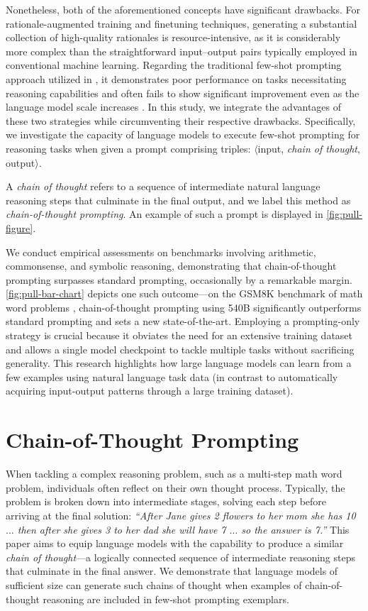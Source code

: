Nonetheless, both of the aforementioned concepts have significant drawbacks. For rationale-augmented training and finetuning techniques, generating a substantial collection of high-quality rationales is resource-intensive, as it is considerably more complex than the straightforward input--output pairs typically employed in conventional machine learning. Regarding the traditional few-shot prompting approach utilized in \citet{brown2020language}, it demonstrates poor performance on tasks necessitating reasoning capabilities and often fails to show significant improvement even as the language model scale increases \citep{rae2021scaling}. In this study, we integrate the advantages of these two strategies while circumventing their respective drawbacks. Specifically, we investigate the capacity of language models to execute few-shot prompting for reasoning tasks when given a prompt comprising triples: $\langle$input, \emph{chain of thought}, output$\rangle$.

A \emph{chain of thought} refers to a sequence of intermediate natural language reasoning steps that culminate in the final output, and we label this method as \textit{chain-of-thought prompting}. An example of such a prompt is displayed in \cref{fig:pull-figure}.

We conduct empirical assessments on benchmarks involving arithmetic, commonsense, and symbolic reasoning, demonstrating that chain-of-thought prompting surpasses standard prompting, occasionally by a remarkable margin. \cref{fig:pull-bar-chart} depicts one such outcome—on the GSM8K benchmark of math word problems \citep{cobbe2021training}, chain-of-thought prompting using \palm{} 540B significantly outperforms standard prompting and sets a new state-of-the-art. Employing a prompting-only strategy is crucial because it obviates the need for an extensive training dataset and allows a single model checkpoint to tackle multiple tasks without sacrificing generality. This research highlights how large language models can learn from a few examples using natural language task data (in contrast to automatically acquiring input-output patterns through a large training dataset).

\section{Chain-of-Thought Prompting} When tackling a complex reasoning problem, such as a multi-step math word problem, individuals often reflect on their own thought process. Typically, the problem is broken down into intermediate stages, solving each step before arriving at the final solution: \textit{``After Jane gives 2 flowers to her mom she has 10 $\ldots$ then after she gives 3 to her dad she will have 7 $\ldots$ so the answer is 7.''} This paper aims to equip language models with the capability to produce a similar \textit{chain of thought}—a logically connected sequence of intermediate reasoning steps that culminate in the final answer. We demonstrate that language models of sufficient size can generate such chains of thought when examples of chain-of-thought reasoning are included in few-shot prompting exemplars.

